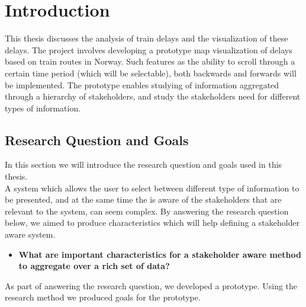 
\chapter{Introduction}
\label{chapter:introduction}

This thesis discusses the analysis of train delays and the visualization of 
these delays. The project involves developing a prototype map visualization of 
delays based on train routes in Norway. Such features as the ability to scroll 
through a certain time period (which will be selectable), both backwards and 
forwards will be implemented. The prototype enables studying of information
aggregated through a hierarchy of stakeholders, and study the stakeholders need
for different types of information.


\section{Research Question and Goals} %
\label{sec:intro_research_question}
In this section we will introduce the research question and goals used in this
thesis.\\

A system which allows the user to select between different type of information
to be presented, and at the same time the is aware of the stakeholders that are
relevant to the system, can seem complex. By answering the research question
below, we aimed to produce characteristics which will help defining a
stakeholder aware system.

\begin{itemize}
	\item \textbf{What are important characteristics for a stakeholder aware 
	method to aggregate over a rich set of data?}
\end{itemize}

As part of answering the research question, we developed a prototype. Using the
research method we produced goals for the prototype.

